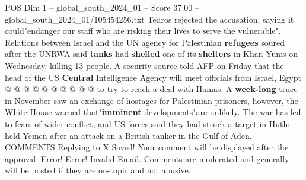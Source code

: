 \begin{textsample}{POS Dim 1 – global\_south\_2024\_01 – Score 37.00 – global\_south\_2024\_01/105454256.txt}
Tedros rejected the accusation, saying it could"endanger our staff who are risking their lives to serve the vulnerable".
Relations between Israel and the UN agency for Palestinian \textbf{refugees} soured after the UNRWA said \textbf{tanks} had \textbf{shelled} one of its \textbf{shelters} in Khan Yunis on Wednesday, killing 13 people.
A security source told AFP on Friday that the head of the US \textbf{Central} Intelligence Agency will meet officials from Israel, Egypt @ @ @ @ @ @ @ @ @ @ to try to reach a deal with Hamas.
A \textbf{week-long} truce in November saw an exchange of hostages for Palestinian prisoners, however, the White House warned that"\textbf{imminent} developments"are unlikely.
The war has led to fears of wider conflict, and US forces said they had struck a target in Huthi-held Yemen after an attack on a British tanker in the Gulf of Aden.
COMMENTS Replying to X Saved!
Your comment will be displayed after the approval.
Error!
Error!
Invalid Email.
Comments are moderated and generally will be posted if they are on-topic and not abusive.

\end{textsample}
